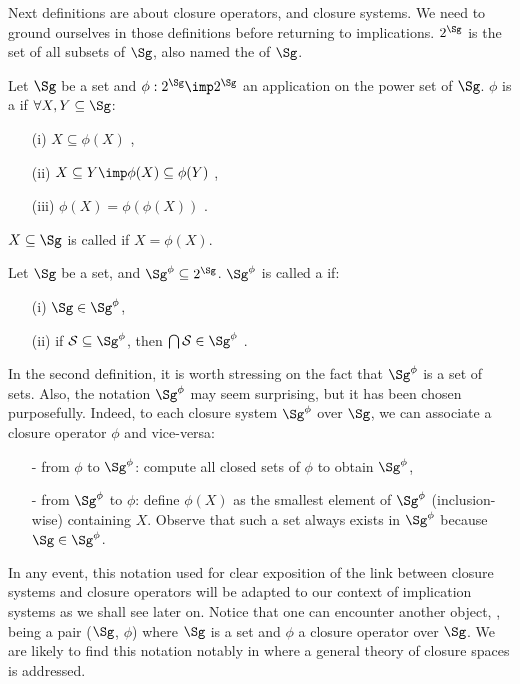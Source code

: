 \vspace{1.2em}

Next definitions are about closure operators, and closure systems. We need 
to ground ourselves in those definitions before returning to implications.
$2^{\Sg}$ is the set of all subsets of $\Sg$, also named the 
of $\Sg$.

\begin{definition} Let $\Sg$ be a set and $\phi : 
	2^{\Sg} \imp 2^{\Sg}$ an application on the power set of $\Sg$. $\phi$ is
	a  if $\forall X, Y \subseteq \Sg$:
	\begin{itemize}
		\item[(i)] $X \subseteq \phi(X)$ ,
		\item[(ii)] $X \subseteq Y \imp \phi(X) \subseteq \phi(Y)$
		,
		\item[(iii)] $\phi(X) = \phi(\phi(X))$ .
	\end{itemize}
	$X \subseteq \Sg$ is called  if $X = \phi(X)$.
\end{definition}

\begin{definition} Let $\Sg$ be a set, and $\Sg^{\phi}
	\subseteq 2^{\Sg}$. $\Sg^{\phi}$ is called a  if:
	\begin{itemize}
		\item[(i)] $\Sg \in \Sg^{\phi}$,
		\item[(ii)] if $\cal{S} \subseteq \Sg^{\phi}$, then $\bigcap \cal{S} 
		\in 
		\Sg^{\phi}$ \quad {}.
	\end{itemize}
	
\end{definition}

\noindent In the second definition, it is worth stressing on the fact that
$\Sg^{\phi}$ is a set of sets. Also, the notation $\Sg^{\phi}$ may seem 
surprising, but it has been chosen purposefully. Indeed, to each closure system
$\Sg^{\phi}$ over $\Sg$, we can associate a closure operator $\phi$ and 
vice-versa:
\begin{itemize}
	\item[-] from $\phi$ to $\Sg^{\phi}$: compute all closed sets of $\phi$ to
	obtain $\Sg^{\phi}$,
	\item[-] from $\Sg^{\phi}$ to $\phi$: define $\phi(X)$ as the smallest element of $\Sg^{\phi}$ (inclusion-wise) containing $X$. Observe that such a set always exists in $\Sg^{\phi}$ because $\Sg \in \Sg^{\phi}$.
\end{itemize}
In any event, this notation used for clear exposition of the link
between closure systems and closure operators will be adapted to our context
of implication systems as we shall see later on. Notice that one can encounter 
another object, , being a pair ($\Sg$, $\phi$) where
$\Sg$ is a set and $\phi$ a closure operator over $\Sg$. We are likely to find
this notation notably in \cite{wild_implicational_1989, 
	wild_theory_1994} where a general theory of closure spaces is addressed.



